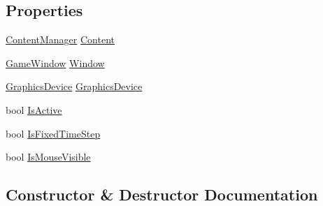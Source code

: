 \subsection*{Properties}
\begin{DoxyCompactItemize}
\item 
\hyperlink{class_microsoft_1_1_xna_1_1_framework_1_1_content_1_1_content_manager}{Content\+Manager} \hyperlink{class_microsoft_1_1_xna_1_1_framework_1_1_game_ae7669d0f2ad5e36ca3f7cf230233f9ca}{Content}
\item 
\hyperlink{class_microsoft_1_1_xna_1_1_framework_1_1_game_window}{Game\+Window} \hyperlink{class_microsoft_1_1_xna_1_1_framework_1_1_game_a828b73f8290c62c869dd984ef5183b3e}{Window}
\item 
\hyperlink{class_microsoft_1_1_xna_1_1_framework_1_1_graphics_1_1_graphics_device}{Graphics\+Device} \hyperlink{class_microsoft_1_1_xna_1_1_framework_1_1_game_a1417c2dcf8a6492d977d0d32b52a95c3}{Graphics\+Device}
\item 
bool \hyperlink{class_microsoft_1_1_xna_1_1_framework_1_1_game_ace749ddff636296cd7388c0da71dca41}{Is\+Active}
\item 
bool \hyperlink{class_microsoft_1_1_xna_1_1_framework_1_1_game_a6c7f6bbf4454452f3e99e8b6855d92d0}{Is\+Fixed\+Time\+Step}
\item 
bool \hyperlink{class_microsoft_1_1_xna_1_1_framework_1_1_game_a407ce0aa3583d8dd0ab7a5afa1772723}{Is\+Mouse\+Visible}
\end{DoxyCompactItemize}


\subsection{Constructor \& Destructor Documentation}
\hypertarget{class_microsoft_1_1_xna_1_1_framework_1_1_game_a52c69dd7373b2be177021a89b9841940}{}
